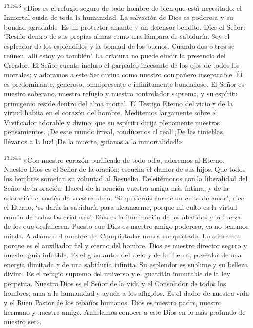 \par
\textsuperscript{131:4.3} «Dios es el refugio seguro de todo hombre de bien que está necesitado; el Inmortal cuida de toda la humanidad. La salvación de Dios es poderosa y su bondad agradable. Es un protector amante y un defensor bendito. Dice el Señor: `Resido dentro de sus propias almas como una lámpara de sabiduría. Soy el esplendor de los espléndidos y la bondad de los buenos. Cuando dos o tres se reúnen, allí estoy yo también'. La criatura no puede eludir la presencia del Creador. El Señor cuenta incluso el parpadeo incesante de los ojos de todos los mortales; y adoramos a este Ser divino como nuestro compañero inseparable. Él es predominante, generoso, omnipresente e infinitamente bondadoso. El Señor es nuestro soberano, nuestro refugio y nuestro controlador supremo, y su espíritu primigenio reside dentro del alma mortal. El Testigo Eterno del vicio y de la virtud habita en el corazón del hombre. Meditemos largamente sobre el Vivificador adorable y divino; que su espíritu dirija plenamente nuestros pensamientos. ¡De este mundo irreal, condúcenos al real! ¡De las tinieblas, llévanos a la luz! ¡De la muerte, guíanos a la inmortalidad!»

\par
\textsuperscript{131:4.4} «Con nuestro corazón purificado de todo odio, adoremos al Eterno. Nuestro Dios es el Señor de la oración; escucha el clamor de sus hijos. Que todos los hombres sometan su voluntad al Resuelto. Deleitémonos con la liberalidad del Señor de la oración. Haced de la oración vuestra amiga más íntima, y de la adoración el sostén de vuestra alma. `Si quisierais darme un culto de amor', dice el Eterno, `os daría la sabiduría para alcanzarme, porque mi culto es la virtud común de todas las criaturas'. Dios es la iluminación de los abatidos y la fuerza de los que desfallecen. Puesto que Dios es nuestro amigo poderoso, ya no tenemos miedo. Alabamos el nombre del Conquistador nunca conquistado. Lo adoramos porque es el auxiliador fiel y eterno del hombre. Dios es nuestro director seguro y nuestro guía infalible. Es el gran autor del cielo y de la Tierra, poseedor de una energía ilimitada y de una sabiduría infinita. Su esplendor es sublime y su belleza divina. Es el refugio supremo del universo y el guardián inmutable de la ley perpetua. Nuestro Dios es el Señor de la vida y el Consolador de todos los hombres; ama a la humanidad y ayuda a los afligidos. Es el dador de nuestra vida y el Buen Pastor de los rebaños humanos. Dios es nuestro padre, nuestro hermano y nuestro amigo. Anhelamos conocer a este Dios en lo más profundo de nuestro ser».

